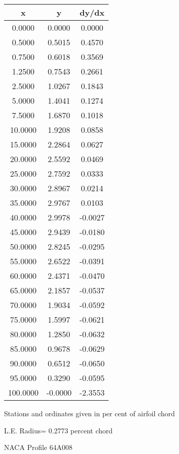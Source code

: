 \documentclass[11pt]{book}
\begin{document}
 \vspace{8mm}
 \begin{tabular}{|c|c|c|} \hline 
  x  &  y  &  dy/dx \\
 \hline
0.0000 & 0.0000 & 0.0000 \\
0.5000 & 0.5015 & 0.4570 \\
0.7500 & 0.6018 & 0.3569 \\
1.2500 & 0.7543 & 0.2661 \\
2.5000 & 1.0267 & 0.1843 \\
5.0000 & 1.4041 & 0.1274 \\
7.5000 & 1.6870 & 0.1018 \\
10.0000 & 1.9208 & 0.0858 \\
15.0000 & 2.2864 & 0.0627 \\
20.0000 & 2.5592 & 0.0469 \\
25.0000 & 2.7592 & 0.0333 \\
30.0000 & 2.8967 & 0.0214 \\
35.0000 & 2.9767 & 0.0103 \\
40.0000 & 2.9978 & -0.0027 \\
45.0000 & 2.9439 & -0.0180 \\
50.0000 & 2.8245 & -0.0295 \\
55.0000 & 2.6522 & -0.0391 \\
60.0000 & 2.4371 & -0.0470 \\
65.0000 & 2.1857 & -0.0537 \\
70.0000 & 1.9034 & -0.0592 \\
75.0000 & 1.5997 & -0.0621 \\
80.0000 & 1.2850 & -0.0632 \\
85.0000 & 0.9678 & -0.0629 \\
90.0000 & 0.6512 & -0.0650 \\
95.0000 & 0.3290 & -0.0595 \\
100.0000 & -0.0000 & -2.3553 \\
 \hline
 \end{tabular}
 \vspace{8mm}


Stations and ordinates given in per cent of airfoil chord 


L.E. Radius=  0.2773 percent chord
 \newpage
  \label{p64A008}
 \begin{Large}
 NACA Profile 64A008
 \end{Large}
  
\end{document}
